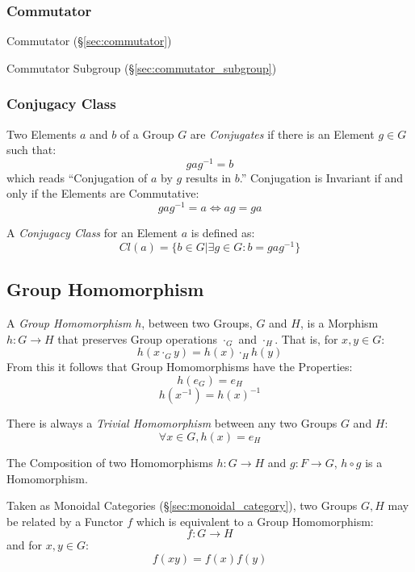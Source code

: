 \subsubsection{Commutator}\label{sec:group_commutator}

Commutator (\S\ref{sec:commutator})

Commutator Subgroup (\S\ref{sec:commutator_subgroup})



\subsubsection{Conjugacy Class}\label{sec:conjugacy_class}

Two Elements $a$ and $b$ of a Group $G$ are \emph{Conjugates} if there
is an Element $g \in G$ such that:
\[
    gag^{-1} = b
\]
which reads ``Conjugation of $a$ by $g$ results in $b$.'' Conjugation
is Invariant if and only if the Elements are Commutative:
\[
    gag^{-1} = a \Leftrightarrow ag = ga
\]

A \emph{Conjugacy Class} for an Element $a$ is defined as:
\[
    Cl(a) = \{ b \in G | \exists g \in G : b = gag^{-1}\}
\]



\subsection{Group Homomorphism}\label{sec:group_homomorphism}

A \emph{Group Homomorphism} $h$, between two Groups, $G$ and $H$, is a
Morphism $h : G \rightarrow H$ that preserves Group operations
$\cdot_G$ and $\cdot_H$. That is, for $x,y \in G$:
\[
    h(x \cdot_G y) = h(x) \cdot_H h(y)
\]
From this it follows that Group Homomorphisms have the Properties:
\[
    h(e_G) = e_H
\]\[
    h(x^{-1}) = h(x)^{-1}
\]

There is always a \emph{Trivial Homomorphism} between any two Groups
$G$ and $H$:
\[
    \forall x \in G, h (x) = e_H
\]

The Composition of two Homomorphisms $h : G \rightarrow H$ and $g : F
\rightarrow G$, $h \circ g$ is a Homomorphism.

Taken as Monoidal Categories (\S\ref{sec:monoidal_category}), two
Groups $G, H$ may be related by a Functor $f$ which is equivalent to a
Group Homomorphism:
\[
    f : G \rightarrow H
\]
and for $x,y \in G$:
\[
    f(xy) = f(x)f(y)
\]



